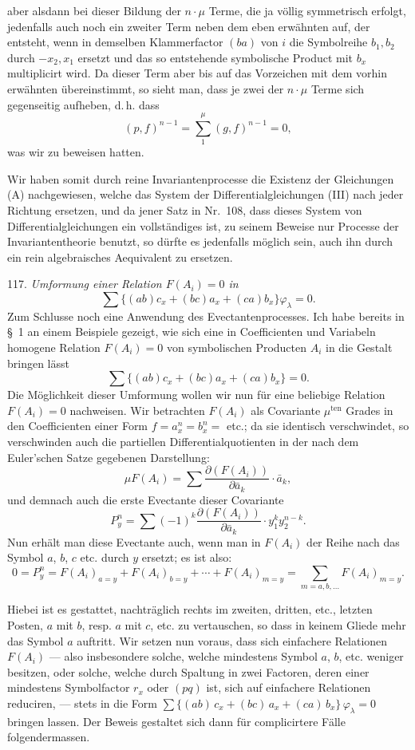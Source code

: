 \documentclass[11pt]{article}
\providecommand{\gesperrt}[1]{\textls[130]{#1}}
\providecommand{\weberpage}[1]{}
\begin{document}
\weberpage{132}
aber alsdann bei dieser Bildung der $n \cdot \mu$ Terme, die ja völlig symmetrisch erfolgt, jedenfalls auch noch ein zweiter Term neben dem eben erwähnten auf, der entsteht, wenn in demselben Klammerfactor $(ba)$ von $i$ die Symbolreihe $b_1, b_2$ durch $-x_2, x_1$ ersetzt und das so entstehende symbolische Product mit $b_x$ multiplicirt wird. Da dieser Term aber bis auf das Vorzeichen mit dem vorhin erwähnten übereinstimmt, so sieht man, dass je zwei der $n \cdot \mu$ Terme sich gegenseitig aufheben, d.\,h. dass
\[
(p,f)^{n-1} = \sum_1^\mu (g,f)^{n-1} = 0,
\]
was wir zu beweisen hatten.

Wir haben somit durch reine Invariantenprocesse die Existenz der Gleichungen (A) nachgewiesen, welche das System der Differentialgleichungen (III) nach jeder Richtung ersetzen, und da jener Satz in Nr.~108, dass dieses System von Differentialgleichungen ein vollständiges ist, zu seinem Beweise nur Processe der Invariantentheorie benutzt, so dürfte es jedenfalls möglich sein, auch ihn durch ein rein algebraisches Aequivalent zu ersetzen.

117. \textit{Umformung einer Relation $F(A_i)=0$ in}
\[
\sum \{(ab)c_x + (bc)a_x + (ca)b_x\} \varphi_\lambda = 0.
\]
Zum Schlusse noch eine Anwendung des Evectantenprocesses. Ich habe bereits in \S~1 an einem Beispiele gezeigt, wie sich eine in Coefficienten und Variabeln homogene Relation $F(A_i)=0$ von symbolischen Producten $A_i$ in die Gestalt bringen lässt
\[
\sum \{(ab)c_x + (bc)a_x + (ca)b_x\} = 0.
\]
Die Möglichkeit dieser Umformung wollen wir nun für eine beliebige Relation $F(A_i)=0$ nachweisen. Wir betrachten $F(A_i)$ als Covariante $\mu^{\text{ten}}$ Grades in den Coefficienten einer Form $f=a_x^n=b_x^n=$ etc.; da sie identisch verschwindet, so verschwinden auch die partiellen Differentialquotienten in der nach dem Euler'schen Satze gegebenen Darstellung:
\[
\mu F(A_i) = \sum \frac{\partial (F(A_i))}{\partial \bar a_k} \cdot \bar a_k,
\]
und demnach auch die erste Evectante dieser Covariante
\[
P_y^n = \sum (-1)^k \frac{\partial (F(A_i))}{\partial \bar a_k} \cdot y_1^k y_2^{n-k}.
\]
Nun erhält man diese Evectante auch, wenn man in $F(A_i)$ der Reihe nach das Symbol $a$, $b$, $c$ etc. durch $y$ ersetzt; es ist also:
\[
0 = P_y^n = F(A_i)_{a=y} + F(A_i)_{b=y} + \cdots + F(A_i)_{m=y} = \sum_{m=a,b,\ldots} F(A_i)_{m=y}.
\]


\weberpage{133}
Hiebei ist es gestattet, nachträglich rechts im zweiten, dritten, etc.,
letzten Posten, $a$ mit $b$, resp. $a$ mit $c$, etc. zu vertauschen, so dass
in keinem Gliede mehr das Symbol $a$ auftritt. Wir setzen nun voraus,
dass sich einfachere Relationen $F(A_i)$ — also insbesondere solche,
welche mindestens \gesperrt{ein} Symbol $a$, $b$, etc. weniger besitzen, oder
solche, welche durch Spaltung in zwei Factoren, deren einer mindestens
\gesperrt{ein} Symbolfactor $r_x$ oder $(pq)$ ist, sich auf einfachere Relationen
reduciren, — stets in die Form $\sum \{(ab)\,c_x + (bc)\,a_x + (ca)\,b_x\}\,\varphi_\lambda = 0$
bringen lassen. Der Beweis gestaltet sich dann für complicirtere Fälle
folgendermassen.
\end{document}
